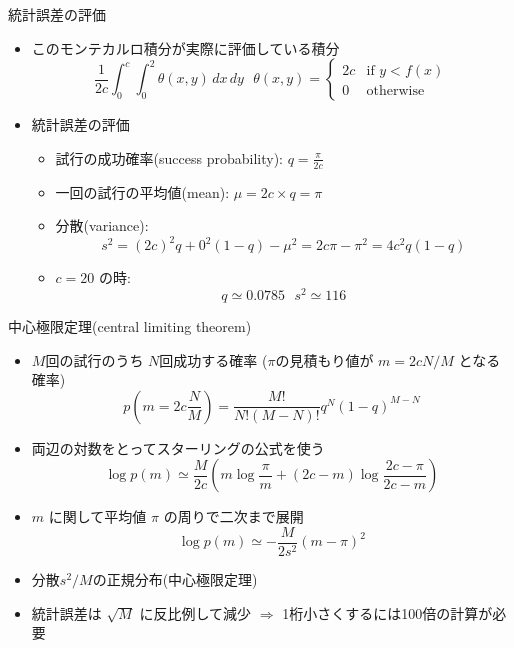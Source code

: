 \begin{frame}[t,fragile]{統計誤差の評価}
  \begin{itemize}
    \setlength{\itemsep}{1em}
  \item このモンテカルロ積分が実際に評価している積分
    \[
    \frac{1}{2c} \int_0^c \!\! \int_0^2 \!\! \theta(x,y) \, dx \, dy
    \ \ \ \theta(x,y) = \begin{cases} 2c & \text{if $y < f(x)$} \\ 0 & \text{otherwise} \end{cases}
    \]
  \item 統計誤差の評価
    \begin{itemize}
      \item 試行の成功確率(success probability): $q=\frac{\pi}{2c}$
      \item 一回の試行の平均値(mean): $\mu = 2c \times q = \pi$
      \item 分散(variance):
        \[ s^2 = (2c)^2q + 0^2(1-q) - \mu^2 = 2c\pi-\pi^2 = 4c^2 q(1-q) \]
      \item $c=20$ の時:
        \[ q \simeq 0.0785 \ \ \ s^2 \simeq 116
        \]
    \end{itemize}
  \end{itemize}
\end{frame}

\begin{frame}[t,fragile]{中心極限定理(central limiting theorem)}
  \begin{itemize}
  \item $M$回の試行のうち $N$回成功する確率 ($\pi$の見積もり値が $m=2cN/M$ となる確率)
    \[
    p(m=2c\frac{N}{M}) = \frac{M!}{N!(M-N)!} q^N (1-q)^{M-N}
    \]
  \item 両辺の対数をとってスターリングの公式を使う
    \[
    \log p(m) \simeq \frac{M}{2c} (m \log \frac{\pi}{m} + (2c-m)\log \frac{2c-\pi}{2c-m})
    \]
  \item $m$ に関して平均値 $\pi$ の周りで二次まで展開
    \[
    \log p(m) \simeq -\frac{M}{2s^2}(m-\pi)^2
    \]
  \item 分散$s^2/M$の正規分布(中心極限定理)
  \item 統計誤差は $\sqrt{M}$ に反比例して減少 $\Rightarrow$ 1桁小さくするには100倍の計算が必要
  \end{itemize}
\end{frame}

